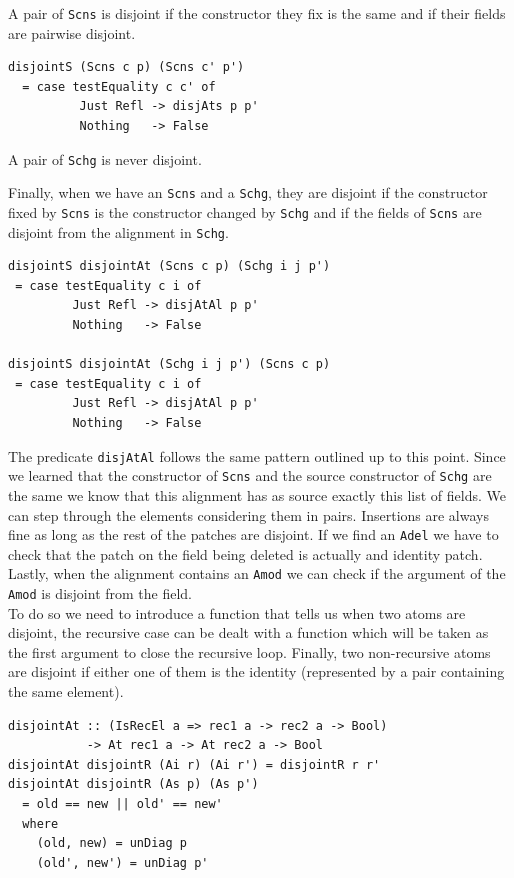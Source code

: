 \documentclass[11pt, titlepage]{article}
\newcommand{\toHaskell}[1]{\texttt{#1}\xspace}
\newcommand{\scns}{\toHaskell{Scns}}
\newcommand{\schg}{\toHaskell{Schg}}
\newcommand{\adel}{\toHaskell{Adel}}
\newcommand{\amod}{\toHaskell{Amod}}
\begin{document}
A pair of \scns is disjoint if the constructor they fix is the same and if their 
fields are pairwise disjoint.

\begin{verbatim}
disjointS (Scns c p) (Scns c' p')
  = case testEquality c c' of
          Just Refl -> disjAts p p'
          Nothing   -> False
\end{verbatim}                   

A pair of \schg is never disjoint.


Finally, when we have an \scns and a \schg, they are disjoint if the constructor 
fixed by \scns is the constructor changed by \schg and if the fields of \scns 
are disjoint from the alignment in \schg. 

\begin{verbatim}
disjointS disjointAt (Scns c p) (Schg i j p')
 = case testEquality c i of
         Just Refl -> disjAtAl p p'
         Nothing   -> False

disjointS disjointAt (Schg i j p') (Scns c p)
 = case testEquality c i of
         Just Refl -> disjAtAl p p'
         Nothing   -> False
\end{verbatim}

The predicate \toHaskell{disjAtAl} follows the same pattern outlined up to this point.
Since we learned that the constructor of \scns and the source constructor of \schg are the same we know that this alignment has as source exactly this list 
of fields. We can step through the elements considering them in pairs. 
Insertions are always fine as long as the rest of the patches are disjoint.
If we find an \adel we have to check that the patch on the field being deleted is actually and identity patch. 
Lastly, when the alignment contains an \amod we can check if the argument of the \amod is disjoint from the field.
\\
To do so we need to introduce a function that tells us when two atoms are disjoint, the recursive case can be dealt with a function which will be taken as the first argument to close the recursive loop.
Finally, two non-recursive atoms are disjoint if either one of them is the identity (represented by a pair containing the same element).

\begin{verbatim}
disjointAt :: (IsRecEl a => rec1 a -> rec2 a -> Bool)
           -> At rec1 a -> At rec2 a -> Bool
disjointAt disjointR (Ai r) (Ai r') = disjointR r r'
disjointAt disjointR (As p) (As p')
  = old == new || old' == new'
  where
    (old, new) = unDiag p
    (old', new') = unDiag p'
\end{verbatim}
\end{document}

